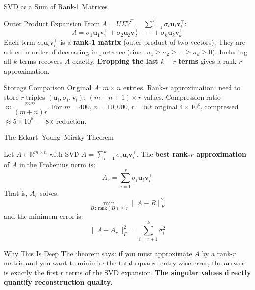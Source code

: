 \documentclass{beamer}
\begin{document}
\begin{frame}[shrink=10]{SVD as a Sum of Rank-1 Matrices}
  \begin{block}{Outer Product Expansion}
    From $A = U\Sigma V^\top = \sum_{i=1}^k \sigma_i\mathbf{u}_i\mathbf{v}_i^\top$:
    \[
      A
        = \sigma_1\mathbf{u}_1\mathbf{v}_1^\top
        + \sigma_2\mathbf{u}_2\mathbf{v}_2^\top
        + \cdots
        + \sigma_k\mathbf{u}_k\mathbf{v}_k^\top
    \]
    Each term $\sigma_i\mathbf{u}_i\mathbf{v}_i^\top$ is a
    \textbf{rank-1 matrix} (outer product of two vectors).
    They are added in order of decreasing importance (since
    $\sigma_1 \geq \sigma_2 \geq \cdots \geq \sigma_k \geq 0$).
    Including all $k$ terms recovers $A$ exactly.
    \textbf{Dropping the last $k - r$ terms} gives a rank-$r$
    approximation.
  \end{block}

  \begin{block}{Storage Comparison}
    Original $A$: $m \times n$ entries.
    Rank-$r$ approximation: need to store $r$ triples
    $(\mathbf{u}_i, \sigma_i, \mathbf{v}_i)$:
    $(m + n + 1) \times r$ values.
    Compression ratio $\approx \dfrac{mn}{(m+n)r}$.
    For $m=400$, $n=10{,}000$, $r=50$:
    original $4 \times 10^6$, compressed $\approx 5 \times 10^5$
    --- 8$\times$ reduction.
  \end{block}
\end{frame}

\begin{frame}[shrink=10]{The Eckart--Young--Mirsky Theorem}
  \begin{theorem}
    Let $A \in \mathbb{R}^{m \times n}$ with SVD
    $A = \sum_{i=1}^k \sigma_i\mathbf{u}_i\mathbf{v}_i^\top$.
    The \textbf{best rank-$r$ approximation} of $A$ in the Frobenius
    norm is:
    \[
      A_r = \sum_{i=1}^r \sigma_i\mathbf{u}_i\mathbf{v}_i^\top
    \]
    That is, $A_r$ solves:
    \[
      \min_{B\,:\,\mathrm{rank}(B) \leq r}
        \|A - B\|_F^2
    \]
    and the minimum error is:
    \[
      \|A - A_r\|_F^2 = \sum_{i=r+1}^k \sigma_i^2
    \]
  \end{theorem}

  \begin{block}{Why This Is Deep}
    The theorem says: if you must approximate $A$ by a rank-$r$ matrix
    and you want to minimise the total squared entry-wise error,
    the answer is exactly the first $r$ terms of the SVD expansion.
    \textbf{The singular values directly quantify reconstruction quality.}
  \end{block}
\end{frame}
\end{document}
